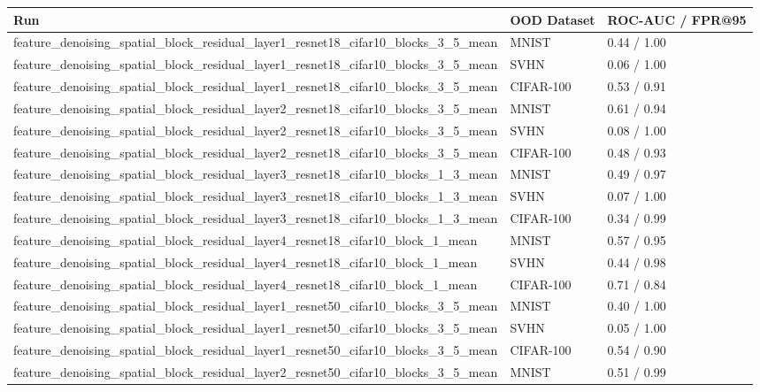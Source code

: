 \begin{tabular}{lll}
\toprule
Run & OOD Dataset & ROC-AUC / FPR@95 \\
\midrule
feature\_denoising\_spatial\_block\_residual\_layer1\_resnet18\_cifar10\_blocks\_3\_5\_mean & MNIST & 0.44 / 1.00 \\
feature\_denoising\_spatial\_block\_residual\_layer1\_resnet18\_cifar10\_blocks\_3\_5\_mean & SVHN & 0.06 / 1.00 \\
feature\_denoising\_spatial\_block\_residual\_layer1\_resnet18\_cifar10\_blocks\_3\_5\_mean & CIFAR-100 & 0.53 / 0.91 \\
feature\_denoising\_spatial\_block\_residual\_layer2\_resnet18\_cifar10\_blocks\_3\_5\_mean & MNIST & 0.61 / 0.94 \\
feature\_denoising\_spatial\_block\_residual\_layer2\_resnet18\_cifar10\_blocks\_3\_5\_mean & SVHN & 0.08 / 1.00 \\
feature\_denoising\_spatial\_block\_residual\_layer2\_resnet18\_cifar10\_blocks\_3\_5\_mean & CIFAR-100 & 0.48 / 0.93 \\
feature\_denoising\_spatial\_block\_residual\_layer3\_resnet18\_cifar10\_blocks\_1\_3\_mean & MNIST & 0.49 / 0.97 \\
feature\_denoising\_spatial\_block\_residual\_layer3\_resnet18\_cifar10\_blocks\_1\_3\_mean & SVHN & 0.07 / 1.00 \\
feature\_denoising\_spatial\_block\_residual\_layer3\_resnet18\_cifar10\_blocks\_1\_3\_mean & CIFAR-100 & 0.34 / 0.99 \\
feature\_denoising\_spatial\_block\_residual\_layer4\_resnet18\_cifar10\_block\_1\_mean & MNIST & 0.57 / 0.95 \\
feature\_denoising\_spatial\_block\_residual\_layer4\_resnet18\_cifar10\_block\_1\_mean & SVHN & 0.44 / 0.98 \\
feature\_denoising\_spatial\_block\_residual\_layer4\_resnet18\_cifar10\_block\_1\_mean & CIFAR-100 & 0.71 / 0.84 \\
feature\_denoising\_spatial\_block\_residual\_layer1\_resnet50\_cifar10\_blocks\_3\_5\_mean & MNIST & 0.40 / 1.00 \\
feature\_denoising\_spatial\_block\_residual\_layer1\_resnet50\_cifar10\_blocks\_3\_5\_mean & SVHN & 0.05 / 1.00 \\
feature\_denoising\_spatial\_block\_residual\_layer1\_resnet50\_cifar10\_blocks\_3\_5\_mean & CIFAR-100 & 0.54 / 0.90 \\
feature\_denoising\_spatial\_block\_residual\_layer2\_resnet50\_cifar10\_blocks\_3\_5\_mean & MNIST & 0.51 / 0.99 \\

\end{tabular}
